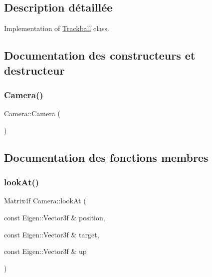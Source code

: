 \subsection{Description détaillée}
Implementation of \hyperlink{class_trackball}{Trackball} class. 

\subsection{Documentation des constructeurs et destructeur}
\mbox{\label{class_camera_ae23af4d7cab430c77d537621cdd16b3f}} 
\subsubsection{\texorpdfstring{Camera()}{Camera()}}
{\footnotesize\ttfamily Camera\+::\+Camera (\begin{DoxyParamCaption}{ }\end{DoxyParamCaption})\hspace{0.3cm}{\ttfamily [default]}}



\subsection{Documentation des fonctions membres}
\mbox{\label{class_camera_a683a2e432969a485412c28e18567c174}} 
\subsubsection{\texorpdfstring{look\+At()}{lookAt()}}
{\footnotesize\ttfamily Matrix4f Camera\+::look\+At (\begin{DoxyParamCaption}\item[{const Eigen\+::\+Vector3f \&}]{position,  }\item[{const Eigen\+::\+Vector3f \&}]{target,  }\item[{const Eigen\+::\+Vector3f \&}]{up }\end{DoxyParamCaption})\hspace{0.3cm}{\ttfamily [static]}}

\mbox{\label{class_camera_aa63f48a3280871eba3a6f74a3c0f2e2e}} 
